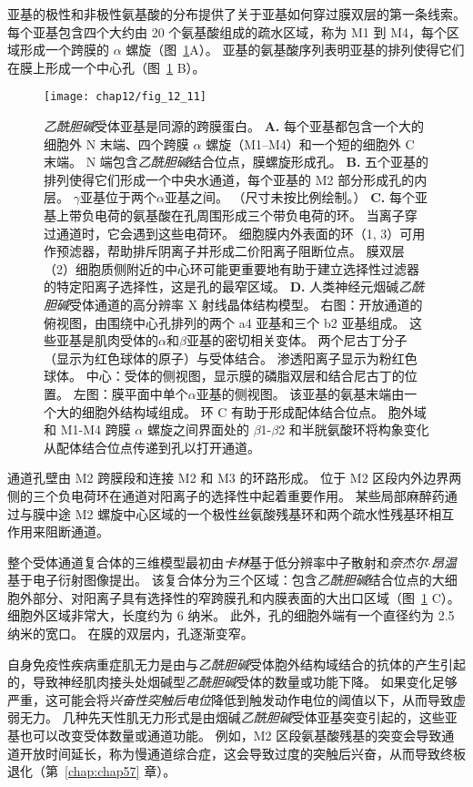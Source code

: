 亚基的极性和非极性氨基酸的分布提供了关于亚基如何穿过膜双层的第一条线索。
每个亚基包含四个大约由 20 个氨基酸组成的疏水区域，称为 M1 到 M4，每个区域形成一个跨膜的 $\alpha$ 螺旋（图~\ref{fig:12_11}A）。
亚基的氨基酸序列表明亚基的排列使得它们在膜上形成一个中心孔（图~\ref{fig:12_11} B）。


\begin{figure}[htbp]
	\centering
	\texttt{[image: chap12/fig\_12\_11]}
	\caption{\textit{乙酰胆碱}受体亚基是同源的跨膜蛋白。
		\textbf{A.} 每个亚基都包含一个大的细胞外 N 末端、四个跨膜 $\alpha$ 螺旋（M1–M4）和一个短的细胞外 C 末端。
		N 端包含\textit{乙酰胆碱}结合位点，膜螺旋形成孔。
		\textbf{B.} 五个亚基的排列使得它们形成一个中央水通道，每个亚基的 M2 部分形成孔的内层。
		$\gamma$亚基位于两个$\alpha$亚基之间。 （尺寸未按比例绘制。）
		\textbf{C.} 每个亚基上带负电荷的氨基酸在孔周围形成三个带负电荷的环。
		当离子穿过通道时，它会遇到这些电荷环。
		细胞膜内外表面的环（1, 3）可用作预滤器，帮助排斥阴离子并形成二价阳离子阻断位点。
		膜双层（2）细胞质侧附近的中心环可能更重要地有助于建立选择性过滤器的特定阳离子选择性，这是孔的最窄区域。
		\textbf{D.} 人类神经元烟碱\textit{乙酰胆碱}受体通道的高分辨率 X 射线晶体结构模型。
		右图：开放通道的俯视图，由围绕中心孔排列的两个 a4 亚基和三个 b2 亚基组成。
		这些亚基是肌肉受体的$\alpha$和$\beta$亚基的密切相关变体。
		两个尼古丁分子（显示为红色球体的原子）与受体结合。
		渗透阳离子显示为粉红色球体。
		中心：受体的侧视图，显示膜的磷脂双层和结合尼古丁的位置。
		左图：膜平面中单个$\alpha$亚基的侧视图。
		该亚基的氨基末端由一个大的细胞外结构域组成。
		环 C 有助于形成配体结合位点。
		胞外域和 M1-M4 跨膜 $\alpha$ 螺旋之间界面处的 $\beta$1-$\beta$2 和半胱氨酸环将构象变化从配体结合位点传递到孔以打开通道\cite{morales2016x}。}
	\label{fig:12_11}
\end{figure}


通道孔壁由 M2 跨膜段和连接 M2 和 M3 的环路形成。
位于 M2 区段内外边界两侧的三个负电荷环在通道对阳离子的选择性中起着重要作用。
某些局部麻醉药通过与膜中途 M2 螺旋中心区域的一个极性丝氨酸残基环和两个疏水性残基环相互作用来阻断通道。


整个受体通道复合体的三维模型最初由\textit{卡林}基于低分辨率中子散射和\textit{奈杰尔$\cdot$昂温}基于电子衍射图像提出。
该复合体分为三个区域：包含\textit{乙酰胆碱}结合位点的大细胞外部分、对阳离子具有选择性的窄跨膜孔和内膜表面的大出口区域（图~\ref{fig:12_11} C）。
细胞外区域非常大，长度约为 6 纳米。
此外，孔的细胞外端有一个直径约为 2.5 纳米的宽口。
在膜的双层内，孔逐渐变窄。


自身免疫性疾病重症肌无力是由与\textit{乙酰胆碱}受体胞外结构域结合的抗体的产生引起的，导致神经肌肉接头处烟碱型\textit{乙酰胆碱}受体的数量或功能下降。
如果变化足够严重，这可能会将\textit{兴奋性突触后电位}降低到触发动作电位的阈值以下，从而导致虚弱无力。
几种先天性肌无力形式是由烟碱\textit{乙酰胆碱}受体亚基突变引起的，这些亚基也可以改变受体数量或通道功能。
例如，M2 区段氨基酸残基的突变会导致通道开放时间延长，称为慢通道综合症，这会导致过度的突触后兴奋，从而导致终板退化（第~\ref{chap:chap57} 章）。



